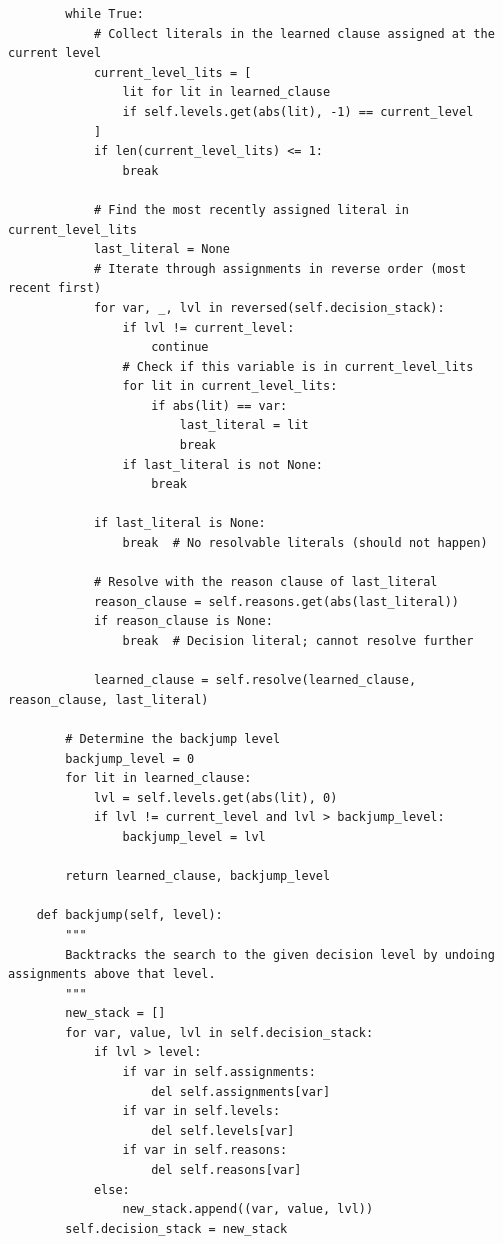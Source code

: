 \begin{lstlisting}
        while True:
            # Collect literals in the learned clause assigned at the current level
            current_level_lits = [
                lit for lit in learned_clause 
                if self.levels.get(abs(lit), -1) == current_level
            ]
            if len(current_level_lits) <= 1:
                break

            # Find the most recently assigned literal in current_level_lits
            last_literal = None
            # Iterate through assignments in reverse order (most recent first)
            for var, _, lvl in reversed(self.decision_stack):
                if lvl != current_level:
                    continue
                # Check if this variable is in current_level_lits
                for lit in current_level_lits:
                    if abs(lit) == var:
                        last_literal = lit
                        break
                if last_literal is not None:
                    break

            if last_literal is None:
                break  # No resolvable literals (should not happen)

            # Resolve with the reason clause of last_literal
            reason_clause = self.reasons.get(abs(last_literal))
            if reason_clause is None:
                break  # Decision literal; cannot resolve further

            learned_clause = self.resolve(learned_clause, reason_clause, last_literal)

        # Determine the backjump level
        backjump_level = 0
        for lit in learned_clause:
            lvl = self.levels.get(abs(lit), 0)
            if lvl != current_level and lvl > backjump_level:
                backjump_level = lvl

        return learned_clause, backjump_level

    def backjump(self, level):
        """
        Backtracks the search to the given decision level by undoing assignments above that level.
        """
        new_stack = []
        for var, value, lvl in self.decision_stack:
            if lvl > level:
                if var in self.assignments:
                    del self.assignments[var]
                if var in self.levels:
                    del self.levels[var]
                if var in self.reasons:
                    del self.reasons[var]
            else:
                new_stack.append((var, value, lvl))
        self.decision_stack = new_stack


\end{lstlisting}
